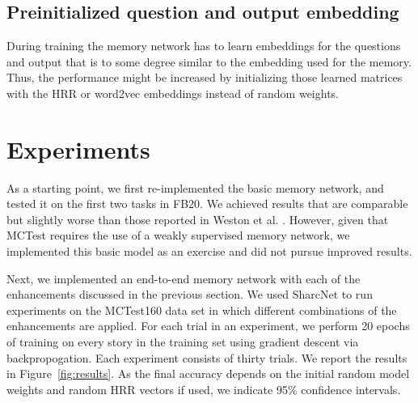 \documentclass[10pt]{article}
\begin{document}
\subsection{Preinitialized question and output embedding}
During training the memory network has to learn embeddings for the questions and 
output that is to some degree similar to the embedding used for the memory.  
Thus, the performance might be increased by initializing those learned matrices 
with the HRR or word2vec embeddings instead of random weights.


\section{Experiments}

As a starting point, we first re-implemented the basic memory network, and tested it on the first two tasks in FB20. We achieved results that are comparable but slightly worse than those reported in Weston et al. \cite{Weston:2015b}. However, given that MCTest requires the use of a weakly supervised memory network, we implemented this basic model as an exercise and did not pursue improved results. 

Next, we implemented an end-to-end memory network with each of the enhancements 
discussed in the previous section. We used SharcNet to run experiments on the 
MCTest160 data set in which different combinations of the enhancements are 
applied.  For each trial in an experiment, we perform 20 epochs of training on 
every story in the training set using gradient descent via backpropogation. Each 
experiment consists of thirty trials. We report the results in 
Figure~\ref{fig:results}. As the final accuracy depends on the initial random 
model weights and random HRR vectors if used, we indicate 95\% confidence 
intervals.
\end{document}
